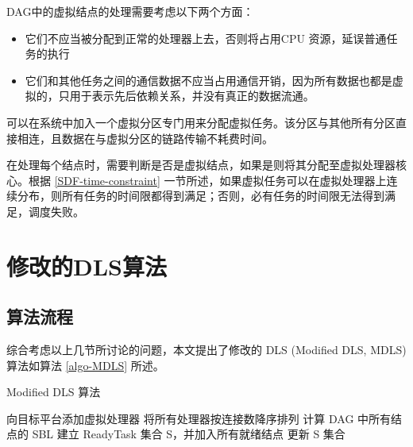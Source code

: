 DAG中的虚拟结点的处理需要考虑以下两个方面：
\begin{itemize}
  \item 它们不应当被分配到正常的处理器上去，否则将占用CPU 资源，延误普通任务的执行
  \item 它们和其他任务之间的通信数据不应当占用通信开销，因为所有数据也都是虚拟的，只用于表示先后依赖关系，并没有真正的数据流通。
\end{itemize}

可以在系统中加入一个虚拟分区专门用来分配虚拟任务。该分区与其他所有分区直接相连，且数据在与虚拟分区的链路传输不耗费时间。

在处理每个结点时，需要判断是否是虚拟结点，如果是则将其分配至虚拟处理器核心。根据 \ref{SDF-time-constraint} 一节所述，如果虚拟任务可以在虚拟处理器上连续分布，则所有任务的时间限都得到满足；否则，必有任务的时间限无法得到满足，调度失败。

\section{修改的DLS算法}
\subsection{算法流程}
综合考虑以上几节所讨论的问题，本文提出了修改的 DLS (Modified DLS, MDLS) 算法如算法 \ref{algo-MDLS} 所述。
\begin{algorithm}
  \caption{Modified DLS 算法}
  \label{algo-MDLS}
  向目标平台添加虚拟处理器\;
  将所有处理器按连接数降序排列\;
  计算 DAG 中所有结点的 SBL\;
  建立 ReadyTask 集合 S，并加入所有就绪结点\;
  更新 S 集合\;
\end{algorithm}



